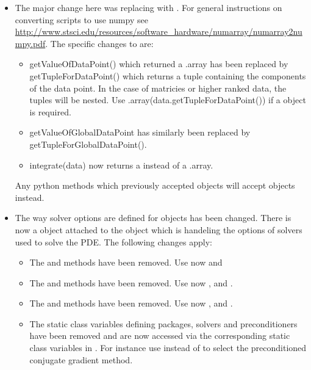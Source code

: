 \begin{itemize}
\item The major change here was replacing  with \numpy.
For general instructions on converting scripts to use numpy see \url{http://www.stsci.edu/resources/software_hardware/numarray/numarray2numpy.pdf}.
The specific changes to \escript are:
\begin{itemize}
  \item getValueOfDataPoint() which returned a .array has been replaced by
 getTupleForDataPoint() which returns a \PYTHON tuple containing
the components of the data point. In the case of matricies or higher ranked data, the tuples will be nested. Use 
\numpy.array(data.getTupleForDataPoint()) if a \numpyNDA object is required.
 \item getValueOfGlobalDataPoint has similarly been replaced by getTupleForGlobalDataPoint().
 \item integrate(data) now returns a \numpyNDA instead of a .array.
\end{itemize}
Any python methods which previously accepted  objects will accept \numpy objects instead.

\item
The way solver options are defined for \LinearPDE objects has been changed. There is now a \SolverOptions object attached to the \LinearPDE object which is handeling the options of solvers used to solve the PDE. The following changes apply:  
\begin{itemize}
\item The  and  methods have been removed. Use now  
and 

\item The  and  methods have been removed. Use now ,
 and
.

\item The  and  methods have been removed. Use now ,
 and
.

\item The static class variables defining packages, solvers and preconditioners have been removed and are now accessed via the corresponding  static class variables in \SolverOptions. For instance use  instead of 
 to select the preconditioned conjugate gradient method.


\end{itemize}
\end{itemize}
